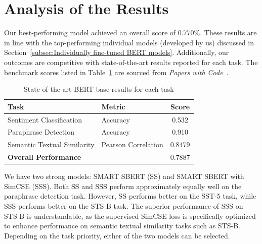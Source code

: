 \section{Analysis of the Results}
Our best-performing model achieved an overall score of 0.770\%. These results are in line with the top-performing individual models (developed by us) discussed in Section~\ref{subsec:Individually fine-tuned BERT models}. Additionally, our outcomes are competitive with state-of-the-art results reported for each task. The benchmark scores listed in Table~\ref{tab:bert-sota-clean} are sourced from \textit{Papers with Code}~\cite{paperswithcode}.

\begin{table}[H]
\centering
\begin{tabular}{|l|l|c|}
\hline
\textbf{Task} & \textbf{Metric} & \textbf{Score} \\
\hline
Sentiment Classification & Accuracy & 0.532 \\
\hline
Paraphrase Detection & Accuracy & 0.910 \\
\hline
Semantic Textual Similarity & Pearson Correlation & 0.8479 \\
\hline
\multicolumn{2}{|l|}{\textbf{Overall Performance}} & 0.7887 \\
\hline
\end{tabular}
\caption{State-of-the-art BERT-base results for each task}
\label{tab:bert-sota-clean}
\end{table}

We have two strong models: SMART SBERT (SS) and SMART SBERT with SimCSE (SSS). Both SS and SSS perform approximately equally well on the paraphrase detection task. However, SS performs better on the SST-5 task, while SSS performs better on the STS-B task. The superior performance of SSS on STS-B is understandable, as the supervised SimCSE loss is specifically optimized to enhance performance on semantic textual similarity tasks such as STS-B. Depending on the task priority, either of the two models can be selected.